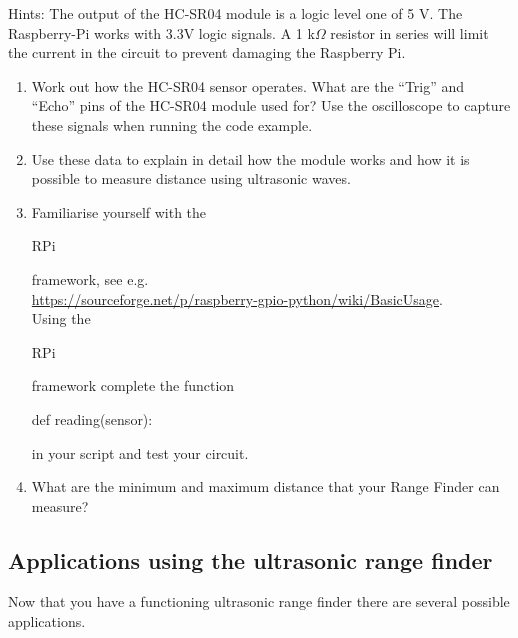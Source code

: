 Hints: The output of the HC-SR04 module is a logic level one of 5 V. The Raspberry-Pi works with 3.3V logic signals. A 1 k$\Omega$ resistor in series will limit the current in the circuit to prevent damaging the Raspberry Pi.
 
\begin{enumerate}
\item 	Work out how the HC-SR04 sensor operates. What are the ``Trig'' and ``Echo'' pins of the HC-SR04 module used for? Use the oscilloscope to capture these signals when running the code example. 

\item Use these data to explain in detail how the module works and how it is possible to measure distance using ultrasonic waves.

\item  Familiarise yourself with the  \begin{tt}RPi\end{tt} framework, see e.g. \\
\url{https://sourceforge.net/p/raspberry-gpio-python/wiki/BasicUsage}.\\
Using the \begin{tt}RPi\end{tt} framework complete the function \begin{tt} def reading(sensor):\end{tt} in your script and test your circuit.

\item What are the minimum and maximum distance that your Range Finder can measure? 
\end{enumerate}

\subsection{Applications using the ultrasonic range finder}

Now that you have a functioning ultrasonic range finder there are several possible applications.

